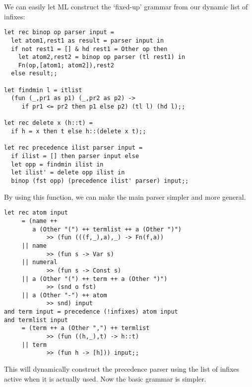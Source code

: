 \begin{slide*}


\vspace*{0.2cm}

We can easily let ML construct the `fixed-up' grammar from our dynamic list of
infixes:

\begin{black}\begin{footnotesize}\begin{verbatim}
let rec binop op parser input =
  let atom1,rest1 as result = parser input in
  if not rest1 = [] & hd rest1 = Other op then
    let atom2,rest2 = binop op parser (tl rest1) in
    Fn(op,[atom1; atom2]),rest2
  else result;;

let findmin l = itlist
  (fun (_,pr1 as p1) (_,pr2 as p2) ->
     if pr1 <= pr2 then p1 else p2) (tl l) (hd l);;

let rec delete x (h::t) =
  if h = x then t else h::(delete x t);;

let rec precedence ilist parser input =
  if ilist = [] then parser input else
  let opp = findmin ilist in
  let ilist' = delete opp ilist in
  binop (fst opp) (precedence ilist' parser) input;;
\end{verbatim}\end{footnotesize}\end{black}

By using this function, we can make the main parser simpler and more general.

\end{slide*}



\begin{slide*}


\begin{black}\begin{footnotesize}\begin{verbatim}
let rec atom input
     = (name ++
        a (Other "(") ++ termlist ++ a (Other ")")
            >> (fun (((f,_),a),_) -> Fn(f,a))
     || name
            >> (fun s -> Var s)
     || numeral
            >> (fun s -> Const s)
     || a (Other "(") ++ term ++ a (Other ")")
            >> (snd o fst)
     || a (Other "-") ++ atom
            >> snd) input
and term input = precedence (!infixes) atom input
and termlist input
     = (term ++ a (Other ",") ++ termlist
            >> (fun ((h,_),t) -> h::t)
     || term
            >> (fun h -> [h])) input;;
\end{verbatim}\end{footnotesize}\end{black}

This will dynamically construct the precedence parser using the list
of infixes active when it is actually used. Now the basic grammar is
simpler.

\end{slide*}



